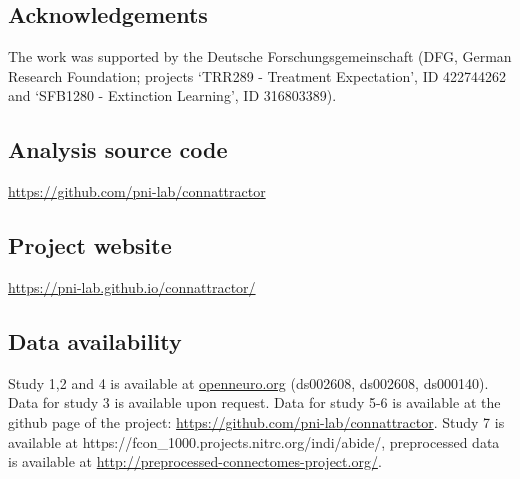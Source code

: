 \documentclass{article}
\begin{document}
\subsection{Acknowledgements}

The work was supported by the Deutsche Forschungsgemeinschaft (DFG, German Research Foundation; projects `TRR289 - Treatment Expectation', ID 422744262 and `SFB1280 - Extinction Learning', ID 316803389).

\subsection{Analysis source code}

\href{https://github.com/pni-lab/connattractor}{https://github.com/pni-lab/connattractor}

\subsection{Project website}

\href{https://pni-lab.github.io/connattractor/}{https://pni-lab.github.io/connattractor/}

\subsection{Data availability}

Study 1,2 and 4 is available at \href{http://openneuro.org}{openneuro.org} (ds002608, ds002608, ds000140). Data for study 3 is available upon request. Data for study 5-6 is available at the github page of the project: \href{https://github.com/pni-lab/connattractor}{https://github.com/pni-lab/connattractor}. Study 7 is available at https://fcon\_1000.projects.nitrc.org/indi/abide/, preprocessed data is available at \href{http://preprocessed-connectomes-project.org/}{http://preprocessed-connectomes-project.org/}.
\printglossaries





\end{document}
